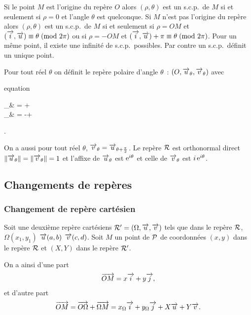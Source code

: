 Si le point \(M\) est l'origine du repère \(O\) alors \((\rho , \theta)\) est un 
s.c.p.\ de \(M\) si et seulement si \(\rho = 0\) et l'angle \(\theta\) est 
quelconque. Si \(M\) n'est pas l'origine du repère alors \((\rho , \theta)\) est 
un s.c.p.\ de \(M\) si et seulement si \(\rho = OM\) et \(\congru{(\vi , 
\vu)}{\theta}{2\pi}\) ou si \(\rho = -OM\) et \(\congru{(\vi , \vu) + 
\pi}{\theta}{2\pi}\). Pour un même point, il existe une infinité de s.c.p.\ 
possibles. Par contre un s.c.p.\ définit un unique point.

\begin{defdef}
  Pour tout réel \(\theta\) on définit le repère polaire d'angle \(\theta\)~: 
  \((O, \vu_\theta, \vv_\theta)\) avec
  \begin{empheq}[box = \shadowbox*]{equation}
    \begin{cases} \vu_\theta& = \cos \theta \vi + \sin \theta \vj \\ \vv_\theta& 
      = -\sin \theta \vi + \cos \theta \vj
    \end{cases}.
  \end{empheq}
\end{defdef}

On a aussi pour tout réel \(\theta\), \(\vv_\theta = \vu_{\theta + 
\frac{\pi}{2}}\).  Le repère \(\Rep\) est orthonormal direct 
\(\norme{\vu_\theta} = \norme{\vv_\theta} = 1\) et l'affixe de \(\vu_\theta\) 
est \(\e^{i \theta}\) et celle de \(\vv_\theta\) est \(i \e^{i \theta}\). 

\subsection{Changements de repères}
\label{subsec:changementsderepere}

\subsubsection{Changement de repère cartésien}
\label{subsubsec:changementsdereperecart}

Soit une deuxième repère cartésiens \(\Rep' = (\Omega , \vu , \vv)\) tels que 
dans le repère \(\Rep\), \(\Omega(x_1 , y_1)\) \(\vu(a , b)\) \(\vv(c , d)\). 
Soit \(M\) un point de \(\P\) de coordonnées \((x , y)\) dans le repère 
\(\Rep\) et \((X , Y)\) dans le repère \(\Rep'\).

On a ainsi d'une part
\begin{equation}
  \vect{OM} = x \vi+ y \vj,
\end{equation}
et d'autre part
\begin{equation}
  \vect{OM} = \vect{O\Omega} + \vect{\Omega M} = x_\Omega \vi + y_\Omega \vj + 
  X \vu +Y\vv.
\end{equation}

